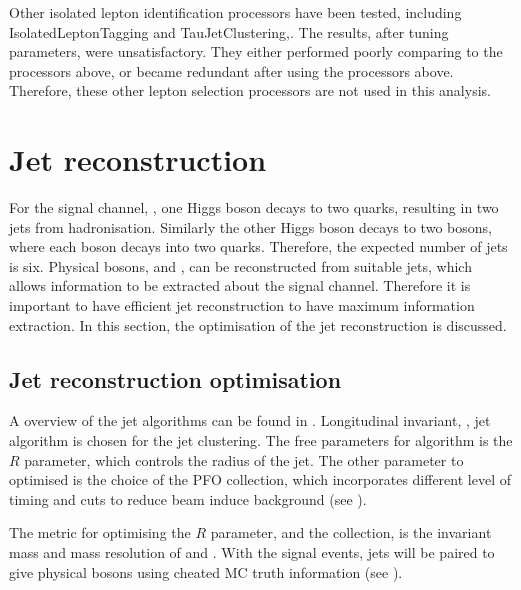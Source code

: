 Other isolated lepton identification processors  have been tested, including IsolatedLeptonTagging and TauJetClustering,. The results, after tuning parameters, were unsatisfactory. They either performed poorly comparing to the processors above, or became redundant after using the processors above. Therefore, these other lepton selection processors are not used in this analysis.


\section{Jet reconstruction}

For the signal channel, \eeToHHbbWWHad, one Higgs boson decays to two \Pbottom quarks, resulting in two jets from hadronisation. Similarly the other Higgs boson decays to two \PW bosons, where each \PW boson decays into two quarks. Therefore, the expected number of jets is six.  Physical bosons,  \PW and \PHiggs, can be reconstructed from suitable jets, which allows information to be extracted about the signal channel. Therefore it is important to have efficient jet reconstruction to have maximum information extraction.  In this section, the optimisation of the jet reconstruction is discussed.


\subsection{Jet reconstruction optimisation}
\label{sec:doubleHiggsJetOptimisation}
A overview of the jet algorithms can be found in \Section{}. Longitudinal invariant, \kt, jet algorithm is chosen for the jet clustering. The free parameters for \kt algorithm is the $R$ parameter, which controls the radius of the jet. The other parameter to optimised is the choice of the PFO collection, which incorporates different level of timing and \pT cuts to reduce beam induce background (see \Section{}). 

The metric for optimising the $R$ parameter, and the \PFO collection, is the invariant mass and mass resolution of \PHiggs and \PW. With the signal events, jets will be paired to give physical bosons using cheated MC truth information (see \Section{}). 

